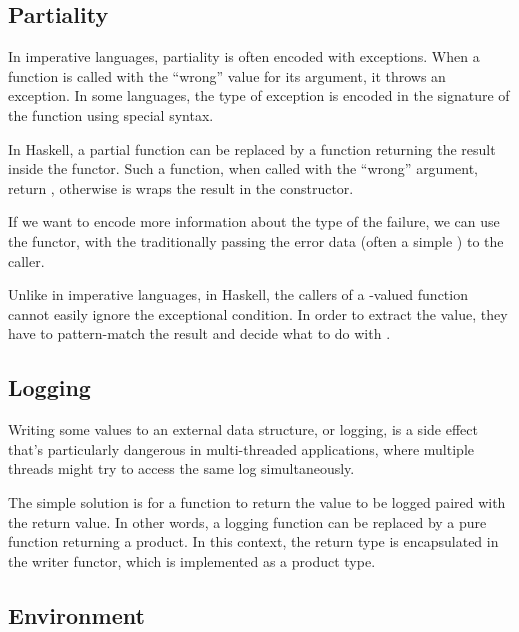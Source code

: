 \documentclass[DaoFP]{subfiles}
\begin{document}
\subsection{Partiality}
In imperative languages, partiality is often encoded with exceptions. When a function is called with the ``wrong'' value for its argument, it throws an exception. In some languages, the type of exception is encoded in the signature of the function using special syntax. 

In Haskell, a partial function can be replaced by a function returning the result inside the  functor. Such a function, when called with the ``wrong'' argument, return , otherwise is wraps the result in the  constructor.

If we want to encode more information about the type of the failure, we can use the  functor, with the  traditionally passing the error data (often a simple ) to the caller.

Unlike in imperative languages, in Haskell, the callers of a -valued function cannot easily ignore the exceptional condition. In order to extract the value, they have to pattern-match the result and decide what to do with .

\subsection{Logging}

Writing some values to an external data structure, or logging, is a side effect that's particularly dangerous in multi-threaded applications, where multiple threads might try to access the same log simultaneously.

The simple solution is for a function to return the value to be logged paired with the return value. In other words, a logging function can be replaced by a pure function returning a product. In this context, the return type is encapsulated in the writer functor, which is implemented as a product type.

\subsection{Environment}
\end{document}
